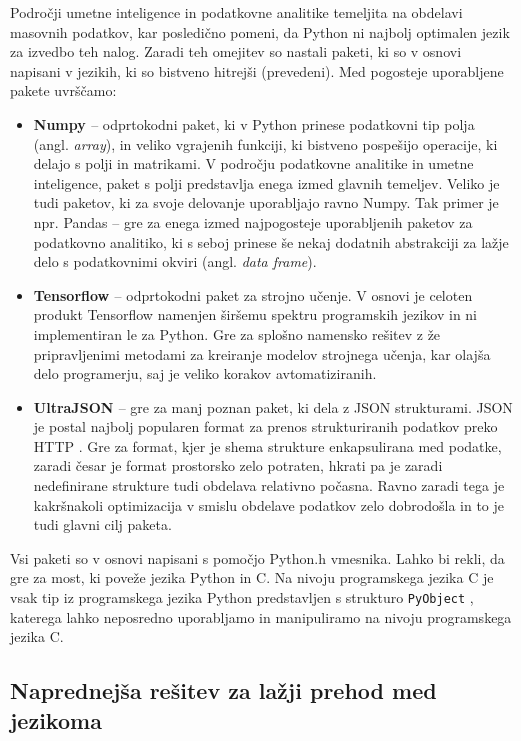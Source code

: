 \documentclass[a4paper,12pt,openright]{book}
\begin{document}
    Področji umetne inteligence in podatkovne analitike temeljita na obdelavi masovnih podatkov, kar posledično pomeni, da Python ni najbolj optimalen jezik za izvedbo teh nalog. Zaradi teh omejitev so nastali paketi, ki so v osnovi napisani v jezikih, ki so bistveno hitrejši (prevedeni). Med pogosteje uporabljene pakete uvrščamo:
    \begin{itemize}
        \item \textbf{Numpy \cite{NUMPY_GITHUB}} – odprtokodni paket, ki v Python prinese podatkovni tip polja (angl. \textit{array}), in veliko vgrajenih funkciji, ki bistveno pospešijo operacije, ki delajo s polji in matrikami. V področju podatkovne analitike in umetne inteligence, paket s polji predstavlja enega izmed glavnih temeljev. Veliko je tudi paketov, ki za svoje delovanje uporabljajo ravno Numpy. Tak primer je npr. Pandas \cite{PANDAS_GITHUB} – gre za enega izmed najpogosteje uporabljenih paketov za podatkovno analitiko, ki s seboj prinese še nekaj dodatnih abstrakciji za lažje delo s podatkovnimi okviri (angl. \textit{data frame}).
        \item \textbf{Tensorflow \cite{abadi2016tensorflow}} –  odprtokodni paket za strojno učenje. V osnovi je celoten produkt Tensorflow namenjen širšemu spektru programskih jezikov in ni implementiran le za Python. Gre za splošno namensko rešitev z že pripravljenimi metodami za kreiranje modelov strojnega učenja, kar olajša delo programerju, saj je veliko korakov avtomatiziranih.
        \item \textbf{UltraJSON \cite{UJSON_GITHUB}} – gre za manj poznan paket, ki dela z JSON strukturami. JSON je postal najbolj popularen format za prenos strukturiranih podatkov preko HTTP \cite{JSON_ACM}. Gre za format, kjer je shema strukture enkapsulirana med podatke, zaradi česar je format prostorsko zelo potraten, hkrati pa je zaradi nedefinirane strukture tudi obdelava relativno počasna. Ravno zaradi tega je kakršnakoli optimizacija v smislu obdelave podatkov zelo dobrodošla in to je tudi glavni cilj paketa.
    \end{itemize}

    \noindent
    Vsi paketi so v osnovi napisani s pomočjo Python.h vmesnika. Lahko bi rekli, da gre za most, ki poveže jezika Python in C. Na nivoju programskega jezika C je vsak tip iz programskega jezika Python predstavljen s strukturo {\tt PyObject} \cite{PY_OBJECT}, katerega lahko neposredno uporabljamo in manipuliramo na nivoju programskega jezika C. 

    \subsection{Naprednejša rešitev za lažji prehod med jezikoma}
\end{document}
